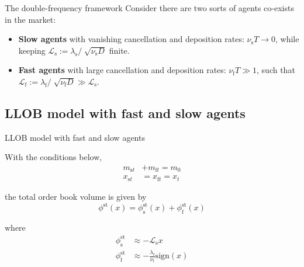\documentclass{beamer}
\begin{document}
\begin{frame}{The double-frequency framework}
Consider there are two sorts of agents co-exists in the market:

\begin{itemize}
\item \textbf{Slow agents} with vanishing cancellation and deposition rates: $\nu_\text{s} T \to 0$, while keeping $\mathcal{L}_\text{s} := \lambda_\text{s}/\sqrt[]{\nu_\text{s} D}$ finite.
\item \textbf{Fast agents} with large cancellation and deposition rates: $\nu_\text{f} T \gg 1$, such that $\mathcal{L}_\text{f} := \lambda_\text{f} / \sqrt[]{\nu_\text{f} D} \gg \mathcal{L}_\text{s}$.
\end{itemize}

\end{frame}

\subsection{LLOB model with fast and slow agents}

\begin{frame}{LLOB model with fast and slow agents}

With the conditions below,
\begin{equation}\label{doublecondition}
\begin{split}
m_{\text{s}t}&+m_{\text{f}t}=m_0 \\
x_{\text{s}t}&=x_{\text{f}t}=x_t
\end{split}
\end{equation}

the total order book volume is given by
\begin{equation}
\phi^\text{st}(x) = \phi_\text{s}^\text{st}(x)+\phi_\text{f}^\text{st}(x)
\end{equation}

where
\begin{equation}
\begin{split}
\phi_\text{s}^\text{st} &\approx -\mathcal{L}_\text{s}x \\
\phi_\text{f}^\text{st} &\approx -\frac{\lambda_\text{f}}{\nu_\text{f}}\text{sign}(x)
\end{split}
\end{equation}

\end{frame}
\end{document}
